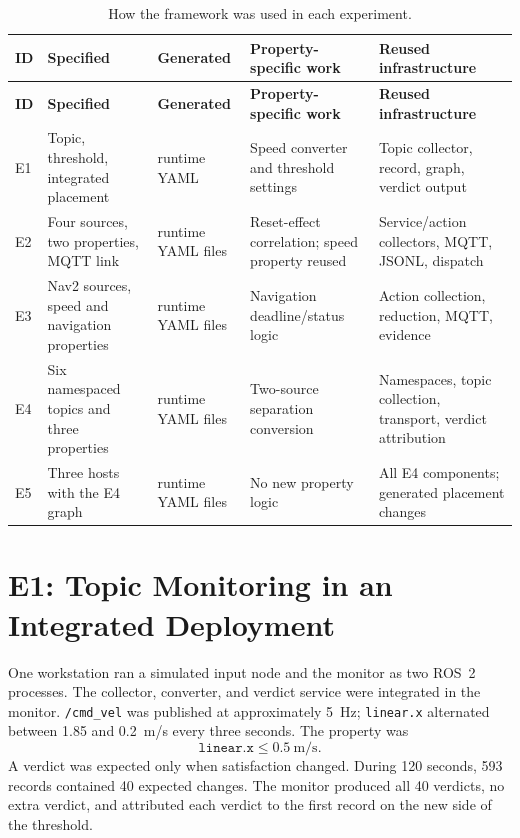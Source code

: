 \begin{small}
\setlength{\tabcolsep}{2pt}
\begin{longtable}{
  >{\raggedright\arraybackslash}p{}
  >{\raggedright\arraybackslash}p{}
  >{\raggedright\arraybackslash}p{}
  >{\raggedright\arraybackslash}p{}
  >{\raggedright\arraybackslash}p{}}
\caption{How the framework was used in each experiment.}
\label{tab:experiment-artifacts}\\
\toprule
\textbf{ID} & \textbf{Specified} & \textbf{Generated} &
\textbf{Property-specific work} & \textbf{Reused infrastructure}\\
\midrule
\endfirsthead
\toprule
\textbf{ID} & \textbf{Specified} & \textbf{Generated} &
\textbf{Property-specific work} & \textbf{Reused infrastructure}\\
\midrule
\endhead
E1 & Topic, threshold, integrated placement & 1 runtime YAML &
Speed converter and threshold settings & Topic collector, record, graph,
verdict output\\
\midrule
E2 & Four sources, two properties, MQTT link & 2 runtime YAML files &
Reset-effect correlation; speed property reused & Service/action collectors,
MQTT, JSONL, dispatch\\
\midrule
E3 & Nav2 sources, speed and navigation properties & 2 runtime YAML files &
Navigation deadline/status logic & Action collection, reduction, MQTT,
evidence\\
\midrule
E4 & Six namespaced topics and three properties & 2 runtime YAML files &
Two-source separation conversion & Namespaces, topic collection, transport,
verdict attribution\\
\midrule
E5 & Three hosts with the E4 graph & 3 runtime YAML files &
No new property logic & All E4 components; generated placement changes\\
\bottomrule
\end{longtable}
\end{small}

\section{E1: Topic Monitoring in an Integrated Deployment}

One workstation ran a simulated input node and the monitor as two ROS~2
processes. The
collector, converter, and verdict service were integrated in the monitor.
\texttt{/cmd\_vel} was published at approximately 5~Hz; \texttt{linear.x}
alternated between 1.85 and 0.2~m/s every three seconds. The property was
\[
  \texttt{linear.x} \leq 0.5\ \text{m/s}.
\]
A verdict was expected only when satisfaction changed. During 120 seconds,
593 records contained 40 expected changes. The monitor produced all 40
verdicts, no extra verdict, and attributed each verdict to the first record on
the new side of the threshold.

